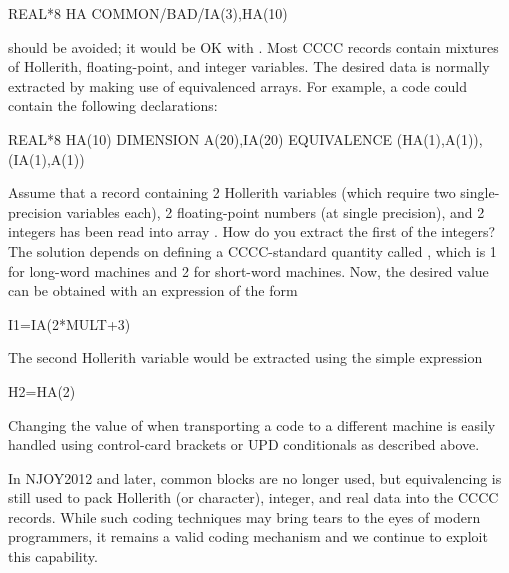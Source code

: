 \small
\begin{ccode}

REAL*8 HA
COMMON/BAD/IA(3),HA(10)

\end{ccode}
\normalsize

\noindent
should be avoided; it would be OK with .  Most CCCC records
contain mixtures of Hollerith, floating-point, and integer variables.
The desired data is normally extracted by making use of equivalenced
arrays.  For example, a code could contain the following declarations:

\small
\begin{ccode}

REAL*8 HA(10)
DIMENSION A(20),IA(20)
EQUIVALENCE (HA(1),A(1)),(IA(1),A(1))

\end{ccode}
\normalsize

\noindent
Assume that a record containing 2 Hollerith variables (which require
two single-precision variables each), 2 floating-point numbers (at
single precision), and 2 integers has been read into array .
How do you extract the first of the integers? The solution depends on
defining a CCCC-standard quantity called ,
which is 1 for long-word machines and 2 for short-word machines.  Now,
the desired value can be obtained with an expression of the form

\small
\begin{ccode}

I1=IA(2*MULT+3)

\end{ccode}
\normalsize

\noindent
The second Hollerith variable would be extracted using the simple
expression

\small
\begin{ccode}

H2=HA(2)

\end{ccode}
\normalsize

\noindent
Changing the value of  when transporting a code to a
different machine is easily handled using control-card brackets or UPD
conditionals as described above.

In NJOY2012 and later, common blocks are no longer used, but equivalencing
is still used to pack Hollerith (or character), integer, and real data
into the CCCC records.  While such coding techniques may bring tears to
the eyes of modern programmers, it remains a valid coding mechanism and
we continue to exploit this capability.

